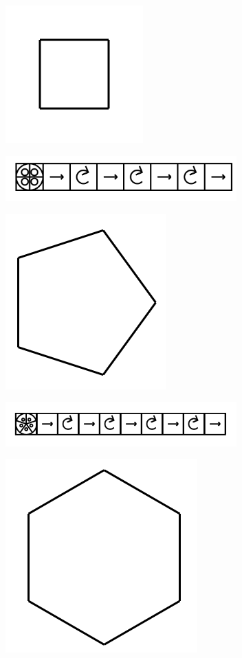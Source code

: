 \documentclass[11pt]{article}
\begin{document}
\includegraphics{image4.png}

\includegraphics[width=3.5in]{image5.png}

\includegraphics{image6.png}

\includegraphics[width=3.5in]{image7.png}

\includegraphics{image8.png}
\end{document}
